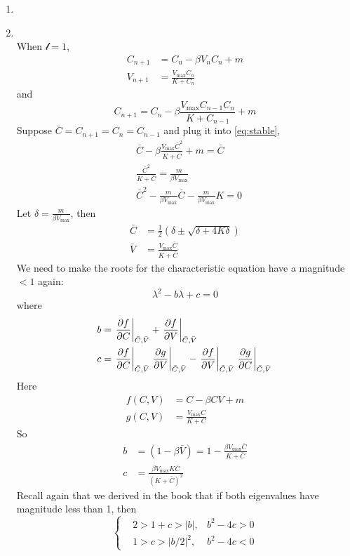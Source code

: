 \begin{homeworkProblem}
\begin{enumerate}
\item \unsolved

\item \unsolved\\ When $\mathcal{l} = 1$, \[\begin{aligned}
    C_{n+1} &= C_n - \beta V_nC_n + m\\
    V_{n+1} &= \frac{V_{\max}C_n}{K+C_{n}}
\end{aligned}\]
and \begin{equation}
    C_{n+1} = C_n - \beta \frac{V_{\max}C_{n-1}C_n}{K+C_{n-1}}+ m
    \label{eq:stable}
\end{equation}
Suppose $\bar C = C_{n+1} = C_n = C_{n-1}$ and plug it into \eqref{eq:stable},
\[
    \begin{aligned}
        &\bar C - \beta \frac{V_{\max}\bar C^2}{K + \bar C} + m = \bar C\\
        &\frac{\bar C^2}{K + \bar C} = \frac{m}{\beta V_{\max}}\\
        &\bar C^2-\frac{m}{\beta V_{\max}}\bar C - \frac{m}{\beta V_{\max}}K = 0
    \end{aligned}
\]
Let $\delta = \frac{m}{\beta V_{\max}}$, then \[
    \begin{aligned}
        \bar C &= \frac{1}{2}\left(\delta \pm \sqrt{\delta + 4K \delta}\right)\\
        \bar V &= \frac{V_{\max} \bar C}{K + \bar C} 
    \end{aligned}
\]
We need to make the roots for the characteristic equation have a magnitude $< 1$
again:
\[
    \lambda^2 - b\lambda + c = 0
\]
where \[
    \begin{aligned}
        b &= \left.\frac{\partial f}{\partial C}\right|_{\bar C, \bar V} +
        \left.\frac{\partial f}{\partial V}\right|_{\bar C, \bar V} \\
        c &= \left.\frac{\partial f}{\partial C}\right|_{\bar C, \bar V}
        \left.\frac{\partial g}{\partial V}\right|_{\bar C, \bar V} -
        \left.\frac{\partial f}{\partial V}\right|_{\bar C, \bar V}
        \left.\frac{\partial g}{\partial C}\right|_{\bar C, \bar V}
    \end{aligned}
\]
Here \[
    \begin{aligned}
        f(C, V) &= C - \beta CV + m\\
        g(C, V) &= \frac{V_{\max}C}{K+C}
    \end{aligned}
\]
So \[
    \begin{aligned}
        b &= (1- \beta \bar V) = 1- \frac{\beta V_{\max}\bar C}{K+\bar C}\\
        c &= \frac{\beta  V_{\max} K \bar C}{(K + \bar C)^2}
    \end{aligned}
\]
Recall again that we derived in the book that if both eigenvalues have magnitude
less than 1, then \[
    \left\{
    \begin{aligned}
        &2 > 1 + c > |b|, & b^2 - 4c > 0\\
        &1 > c > |b/2|^2, & b^2 - 4c < 0
    \end{aligned}
    \right.
\]



\end{enumerate}
\end{homeworkProblem}
